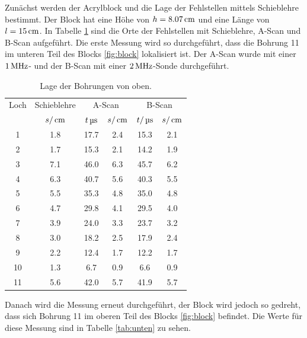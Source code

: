Zunächst werden der Acrylblock und die Lage der Fehlstellen mittels Schieblehre
bestimmt. Der Block hat eine Höhe von $h=8.07\,\si{\centi\meter}$ und eine Länge von $l=15\,\si{\centi\meter}$.
In Tabelle \ref{tab:oben} sind die Orte der Fehlstellen mit Schieblehre, A-Scan
und B-Scan aufgeführt. Die erste Messung wird so durchgeführt, dass die Bohrung
11 im unteren Teil des Blocks \ref{fig:block} lokalisiert ist. Der A-Scan wurde
mit einer $1\,\si{\mega\hertz}$- und der B-Scan mit einer $2\,\si{\mega\hertz}$-Sonde durchgeführt.
\begin{table}[H]
  \centering
  \begin{tabular}{c|c|cc|cc}
    \toprule
    \multicolumn{1}{c|}{Loch}& \multicolumn{1}{c|}{Schieblehre} & \multicolumn{2}{c|}{A-Scan}
    & \multicolumn{2}{c}{B-Scan} \\
    & $s/\,\si{\centi\meter}$ & $t\,\si{\micro\second}$ & $s/\,\si{\centi\meter}$ & $t/\,\si{\micro\second}$ & $s/\,\si{\centi\meter}$ \\
    \midrule
     1  &  1.8 &  17.7 & 2.4 & 15.3 & 2.1 \\
     2  &  1.7 &  15.3 & 2.1 & 14.2 & 1.9 \\
     3  &  7.1 &  46.0 & 6.3 & 45.7 & 6.2 \\
     4  &  6.3 &  40.7 & 5.6 & 40.3 & 5.5 \\
     5  &  5.5 &  35.3 & 4.8 & 35.0 & 4.8 \\
     6  &  4.7 &  29.8 & 4.1 & 29.5 & 4.0 \\
     7  &  3.9 &  24.0 & 3.3 & 23.7 & 3.2 \\
     8  &  3.0 &  18.2 & 2.5 & 17.9 & 2.4 \\
     9  &  2.2 &  12.4 & 1.7 & 12.2 & 1.7 \\
    10  &  1.3 &   6.7 & 0.9 &  6.6 & 0.9 \\
    11  &  5.6 &  42.0 & 5.7 & 41.9 & 5.7 \\
    \bottomrule
  \end{tabular}
  \caption{Lage der Bohrungen von oben.}
  \label{tab:oben}
\end{table}
Danach wird die Messung erneut durchgeführt, der Block wird jedoch so gedreht,
dass sich Bohrung 11 im oberen Teil des Blocks \ref{fig:block} befindet.
Die Werte für diese Messung sind in Tabelle \ref{tab:unten} zu sehen.

